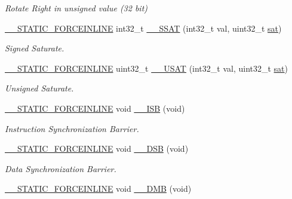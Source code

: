 \begin{DoxyCompactItemize}
\begin{DoxyCompactList}\small\item\em Rotate Right in unsigned value (32 bit) \end{DoxyCompactList}\item 
\hyperlink{cmsis__iccarm_8h_ab904513442afdf77d4f8c74f23cbb040}{\+\_\+\+\_\+\+S\+T\+A\+T\+I\+C\+\_\+\+F\+O\+R\+C\+E\+I\+N\+L\+I\+NE} int32\+\_\+t \hyperlink{group___c_m_s_i_s___core___instruction_interface_ga372c0535573dde3e37f0f08c774a3487}{\+\_\+\+\_\+\+S\+S\+AT} (int32\+\_\+t val, uint32\+\_\+t \hyperlink{group___c_m_s_i_s___core___instruction_interface_gaafcad33f86db3a8e1f55925989f9d2dc}{sat})
\begin{DoxyCompactList}\small\item\em Signed Saturate. \end{DoxyCompactList}\item 
\hyperlink{cmsis__iccarm_8h_ab904513442afdf77d4f8c74f23cbb040}{\+\_\+\+\_\+\+S\+T\+A\+T\+I\+C\+\_\+\+F\+O\+R\+C\+E\+I\+N\+L\+I\+NE} uint32\+\_\+t \hyperlink{group___c_m_s_i_s___core___instruction_interface_ga6562dbd8182d1571e22dbca7ebdfa9bc}{\+\_\+\+\_\+\+U\+S\+AT} (int32\+\_\+t val, uint32\+\_\+t \hyperlink{group___c_m_s_i_s___core___instruction_interface_gaafcad33f86db3a8e1f55925989f9d2dc}{sat})
\begin{DoxyCompactList}\small\item\em Unsigned Saturate. \end{DoxyCompactList}\item 
\hyperlink{cmsis__iccarm_8h_ab904513442afdf77d4f8c74f23cbb040}{\+\_\+\+\_\+\+S\+T\+A\+T\+I\+C\+\_\+\+F\+O\+R\+C\+E\+I\+N\+L\+I\+NE} void \hyperlink{group___c_m_s_i_s___core___instruction_interface_gae26c2b3961e702aeabc24d4984ebd369}{\+\_\+\+\_\+\+I\+SB} (void)
\begin{DoxyCompactList}\small\item\em Instruction Synchronization Barrier. \end{DoxyCompactList}\item 
\hyperlink{cmsis__iccarm_8h_ab904513442afdf77d4f8c74f23cbb040}{\+\_\+\+\_\+\+S\+T\+A\+T\+I\+C\+\_\+\+F\+O\+R\+C\+E\+I\+N\+L\+I\+NE} void \hyperlink{group___c_m_s_i_s___core___instruction_interface_ga7fe277f5385d23b9c44b2cbda1577ce9}{\+\_\+\+\_\+\+D\+SB} (void)
\begin{DoxyCompactList}\small\item\em Data Synchronization Barrier. \end{DoxyCompactList}\item 
\hyperlink{cmsis__iccarm_8h_ab904513442afdf77d4f8c74f23cbb040}{\+\_\+\+\_\+\+S\+T\+A\+T\+I\+C\+\_\+\+F\+O\+R\+C\+E\+I\+N\+L\+I\+NE} void \hyperlink{group___c_m_s_i_s___core___instruction_interface_gab1ea24daaaaee9c828f90cbca330cb5e}{\+\_\+\+\_\+\+D\+MB} (void)

\end{DoxyCompactItemize}
